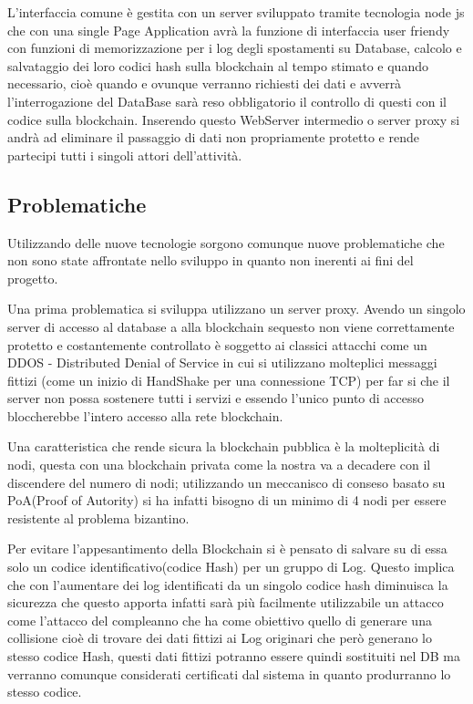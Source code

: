 \documentclass[12pt,titlepage]{report}
\begin{document}
L'interfaccia comune è gestita con un server sviluppato tramite tecnologia node js che con una single Page Application avrà la funzione di interfaccia user friendy con funzioni di memorizzazione per i log degli spostamenti su Database, calcolo e salvataggio dei loro codici hash sulla blockchain al tempo stimato e quando necessario, cioè quando e ovunque verranno richiesti dei dati e avverrà l'interrogazione del DataBase sarà reso obbligatorio il controllo di questi con il codice sulla blockchain. Inserendo questo WebServer intermedio o server proxy si andrà ad eliminare il passaggio di dati non propriamente protetto e rende partecipi tutti i singoli attori dell'attività.

\subsection{Problematiche}
Utilizzando delle nuove tecnologie sorgono comunque nuove problematiche che non sono state affrontate nello sviluppo in quanto non inerenti ai fini del progetto.

Una prima problematica si sviluppa utilizzano un server proxy. Avendo un singolo server di accesso al database a alla blockchain sequesto non viene correttamente protetto e costantemente controllato è soggetto ai classici attacchi come un DDOS - Distributed Denial of Service in cui si utilizzano molteplici messaggi fittizi (come un inizio di HandShake per una connessione TCP) per far si che il server non possa sostenere tutti i servizi e essendo l'unico punto di accesso bloccherebbe  l'intero accesso alla rete blockchain.

Una caratteristica che rende sicura la blockchain pubblica è la molteplicità di nodi, questa con una blockchain privata come la nostra va a decadere con il discendere  del numero di nodi; utilizzando un meccanisco di conseso basato su PoA(Proof of Autority) si ha infatti bisogno di un minimo di 4 nodi per essere resistente al problema bizantino.

Per evitare l'appesantimento della Blockchain si è pensato di salvare su di essa solo un codice identificativo(codice Hash) per un gruppo di Log. Questo implica che con l'aumentare dei log identificati da un singolo codice hash diminuisca la sicurezza che questo apporta infatti sarà più facilmente utilizzabile un attacco come l'attacco del compleanno che ha come obiettivo quello di generare una collisione cioè di trovare dei dati fittizi ai Log originari che però generano lo stesso codice Hash, questi dati fittizi potranno essere quindi sostituiti nel DB ma verranno comunque considerati certificati dal sistema in quanto produrranno lo stesso codice.
\end{document}
